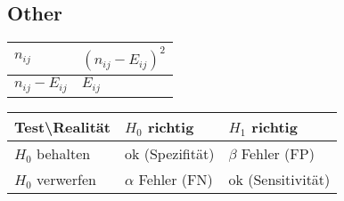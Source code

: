 \documentclass[a4paper]{article}
\begin{document}
\begin{landscape}
\begin{multicols}{4}
    \section*{Other}
    \begin{center}
        \begin{tabular}{l|l}
            $n_{ij}$ & $(n_{ij}-E_{ij})^2$           \\ \hline
            $n_{ij}-E_{ij}$           & $E_{ij}$
            \end{tabular}
    \end{center}
    \begin{center}
        \begin{tabular}{|l|l|l|}
            Test\textbackslash{}Realität & $H_0$ richtig                           & $H_1$ richtig       \\ \hline
            $H_0$ behalten                  & \multicolumn{1}{l|}{ok (Spezifität)} & $\beta$ Fehler (FP)     \\ \hline 
            $H_0$ verwerfen                 & \multicolumn{1}{l|}{$\alpha$ Fehler (FN)}    & ok (Sensitivität) 
            \end{tabular}
    \end{center}
    
    \end{multicols}
\end{landscape}
\end{document}
